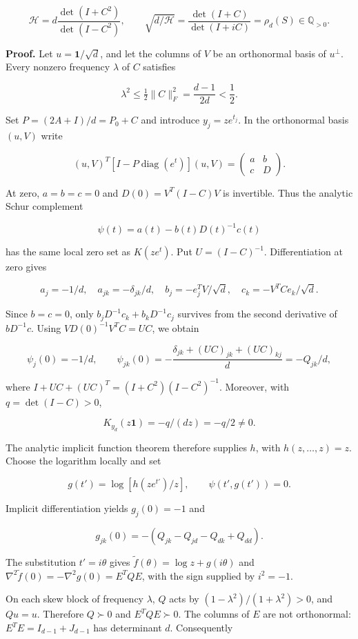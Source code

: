 \documentclass[11pt,a4paper]{article}
\begin{document}
\[
\mathcal H=d\frac{\det(I+C^2)}{\det(I-C^2)},\qquad
\sqrt{d/\mathcal H}=\frac{\det(I+C)}{\det(I+iC)}=\rho_d(S)\in\mathbb Q_{>0}.
\]

\textbf{Proof.} Let \(u=\mathbf1/\sqrt d\), and let the columns of \(V\) be an orthonormal basis of \(u^\perp\). Every nonzero frequency \(\lambda\) of \(C\) satisfies

\[
\lambda^2\le\tfrac12\|C\|_F^2=\frac{d-1}{2d}<\frac12.
\]

Set \(P=(2A+I)/d=P_0+C\) and introduce \(y_j=ze^{t_j}\). In the orthonormal basis \((u,V)\) write

\[
(u,V)^T[I-P\operatorname{diag}(e^t)](u,V)
=\begin{pmatrix}a&b\\c&D\end{pmatrix}.
\]

At zero, \(a=b=c=0\) and \(D(0)=V^T(I-C)V\) is invertible. Thus the analytic Schur complement

\[
\psi(t)=a(t)-b(t)D(t)^{-1}c(t)
\]

has the same local zero set as \(K(ze^t)\). Put \(U=(I-C)^{-1}\). Differentiation at zero gives

\[
a_j=-1/d,\quad a_{jk}=-\delta_{jk}/d,\quad
b_j=-e_j^TV/\sqrt d,\quad c_k=-V^TCe_k/\sqrt d.
\]

Since \(b=c=0\), only \(b_jD^{-1}c_k+b_kD^{-1}c_j\) survives from the second derivative of \(bD^{-1}c\). Using \(VD(0)^{-1}V^TC=UC\), we obtain

\[
\psi_j(0)=-1/d,\qquad
\psi_{jk}(0)=-\frac{\delta_{jk}+(UC)_{jk}+(UC)_{kj}}d=-Q_{jk}/d,
\]

where \(I+UC+(UC)^T=(I+C^2)(I-C^2)^{-1}\). Moreover, with \(q=\det(I-C)>0\),

\[
K_{y_d}(z\mathbf1)=-q/(dz)=-q/2\ne0.
\]

The analytic implicit function theorem therefore supplies \(h\), with \(h(z,\ldots,z)=z\). Choose the logarithm locally and set

\[
g(t')=\log[h(ze^{t'})/z],\qquad \psi(t',g(t'))=0.
\]

Implicit differentiation yields \(g_j(0)=-1\) and

\[
g_{jk}(0)=-(Q_{jk}-Q_{jd}-Q_{dk}+Q_{dd}).
\]

The substitution \(t'=i\theta\) gives \(\widetilde f(\theta)=\log z+g(i\theta)\) and \(\nabla^2\widetilde f(0)=-\nabla^2g(0)=E^TQE\), with the sign supplied by \(i^2=-1\).

On each skew block of frequency \(\lambda\), \(Q\) acts by \((1-\lambda^2)/(1+\lambda^2)>0\), and \(Qu=u\). Therefore \(Q\succ0\) and \(E^TQE\succ0\). The columns of \(E\) are not orthonormal: \(E^TE=I_{d-1}+J_{d-1}\) has determinant \(d\). Consequently
\end{document}
